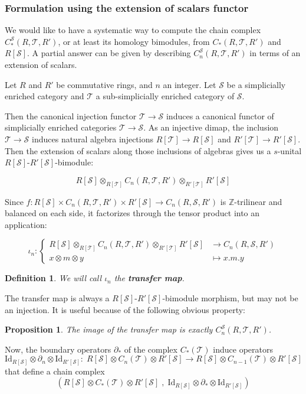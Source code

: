 \documentclass[a4paper,fleqn]{cas-sc}
\newtheorem{prop}[thm]{Proposition}%
\newtheorem{dfnt}{Definition}%
\newcommand{\cS}{{\mathcal{S}}}
\newcommand{\cT}{{\mathcal{T}}}
\begin{document}
\subsubsection{Formulation using the extension of scalars functor}
We would like to have a systematic way to compute the chain complex $C^{\cS}_*(R,\cT, R')$, or at least its homology bimodules, from $C_*(R,\cT, R')$ and $R[\cS]$.
A partial answer can be given by describing $C^{\cS}_n(R,\cT, R')$ in terms of an extension of scalars.

Let $R$ and $R'$ be commutative rings, and $n$ an integer. 
Let $\cS$ be a simplicially enriched category and $\cT$ a sub-simplicially enriched category of $\cS$. 

Then the canonical injection functor $\cT \to \cS$ induces a canonical functor of simplicially enriched categories $\cT\to \cS$. As an injective dimap, the inclusion $\cT\to \cS$ induces natural algebra injections $R[\cT] \to R[\cS]$ and $R'[\cT] \to R'[\cS]$.
Then the extension of scalars along those inclusions of algebras gives us a $s$-unital $R[\cS]$-$R'[\cS]$-bimodule:

\[ R[\cS] \otimes_{R[\cT]} C_n(R, \cT, R') \otimes_{R'[\cT]} R'[\cS]\]

Since $f: R[\cS] \times C_n(R, \cT, R') \times R'[\cS] \to C_n(R, \cS, R')$ is $\mathbb{Z}$-trilinear and balanced on each side, it factorizes through the tensor product into an application:

\[\iota_n:  \begin{cases} 
      R[\cS] \otimes_{R[\cT]} C_n(R, \cT, R') \otimes_{R'[\cT]} R'[\cS]
      &\to C_n(R, \cS, R')\\
      x \otimes m \otimes y &\mapsto x.m.y
   \end{cases}
\]

\begin{dfnt}
\label{def:transfer}
We will call $\iota_n$ the \textbf{transfer map}. 
\end{dfnt}
The transfer map is always a $R[\cS]$-$R'[\cS]$-bimodule morphism, but may not be an injection. It is useful because of the following obvious property:

\begin{prop}
The image of the transfer map is exactly $C^{\cS}_n(R,\cT, R')$. 
\end{prop}

Now, the boundary operators $\partial_*$ of the complex $C_{*} (\cT)$ induce operators
\[
\mathrm{Id}_{R[\cS]} \otimes \partial_n \otimes \mathrm{Id}_{R'[\cS]}
: \;
R[\cS] \otimes C_n(\cT) \otimes R'[\cS]
\to
R[\cS] \otimes C_{n-1}(\cT) \otimes R'[\cS]
\]
\noindent that define a chain complex
\[
\left(
R[\cS] \otimes C_{*}(\cT) \otimes R'[\cS]
\; , \;
\mathrm{Id}_{R[\cS]} \otimes \partial_{*} \otimes \mathrm{Id}_{R'[\cS]}
\right)
\]
\end{document}
